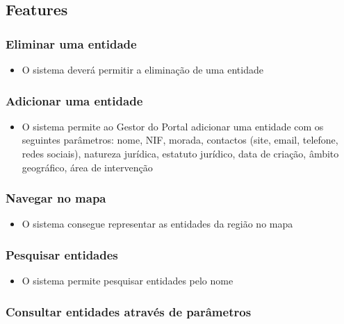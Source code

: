 \documentclass{scrreprt}
\begin{document}
\subsection{Features}

\subsubsection{Eliminar uma entidade}

\begin{itemize}
    \item O sistema deverá permitir a eliminação de uma entidade
\end{itemize}

\subsubsection{Adicionar uma entidade}

\begin{itemize}
    \item O sistema permite ao Gestor do Portal adicionar uma entidade com os seguintes parâmetros: nome, NIF, morada, contactos (site, email, telefone, redes sociais), natureza jurídica, estatuto jurídico, data de criação, âmbito geográfico, área de intervenção
\end{itemize}

\subsubsection{Navegar no mapa}

\begin{itemize}
    \item O sistema consegue representar as entidades da região no mapa
\end{itemize}

\subsubsection{Pesquisar entidades}

\begin{itemize}
    \item O sistema permite pesquisar entidades pelo nome
\end{itemize}

\subsubsection{Consultar entidades através de parâmetros}
\end{document}
